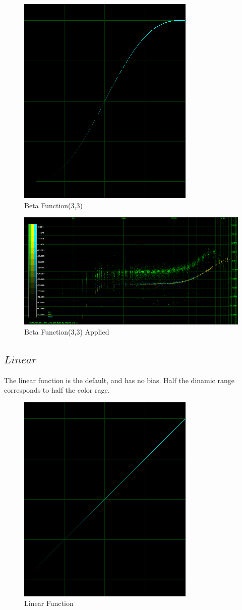 \documentclass[10pt,a4paper]{report}
\begin{document}
\begin{figure}[H]
	\centering
	\includegraphics[width=0.4\linewidth]{plots/BetaFunctionPlot_2}
	\caption[Beta Function(3,3)]{Beta Function(3,3)}
	\label{fig:betafunctionplot2}
\end{figure}

\begin{figure}[H]
	\centering
	\includegraphics[width=1\linewidth]{plots/BetaFunctionPlot_2_Data}
	\caption[Beta Function(3,3)]{Beta Function(3,3) Applied}
	\label{fig:betafunctionplot2data}
\end{figure}

\newpage
\subsection{$Linear$} 

The linear function is the default, and has no bias. Half the dinamic range corresponds to half the color rage.

\begin{figure}[H]
	\centering
	\includegraphics[width=0.4\linewidth]{plots/BetaFunctionPlot_3}
	\caption[Linear]{Linear Function}
	\label{fig:betafunctionplot3}
\end{figure}
\end{document}
